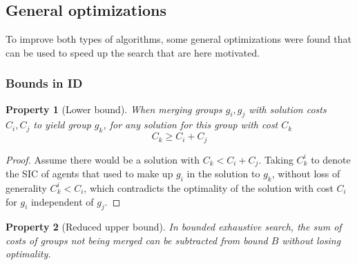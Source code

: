 \documentclass[english,10pt]{article}
\newtheorem{property}{Property}
\begin{document}
	\subsection{General optimizations}
	
	To improve both types of algorithms, some general optimizations were found that can be used to speed up the search that are here motivated. 
	\subsubsection{Bounds in ID}
	\begin{property}[Lower bound]
		When merging groups $g_i,g_j$ with solution costs $C_i,C_j$ to yield group $g_k$, for any solution for this group with cost $C_k$
		\[C_k\geq C_i + C_j\]
	\end{property}
	\begin{proof}
		Assume there would be a solution with $C_k < C_i + C_j$. Taking $C_k^i$ to denote the SIC of agents that used to make up $g_i$ in the solution to $g_k$, without loss of generality $C_k^i < C_i$, which contradicts the optimality of the solution with cost $C_i$ for $g_i$ independent of $g_j$.
	\end{proof}
	\begin{property}[Reduced upper bound]
		In bounded exhaustive search, the sum of costs of groups not being merged can be subtracted from bound $B$ without losing optimality.
	\end{property}
\end{document}

